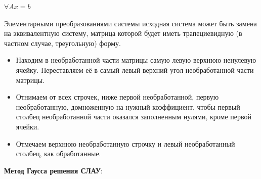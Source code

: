 \(\forall Ax = b\)

Элементарными преобразованиями системы исходная система может быть замена на эквивалентную систему, матрица которой будет иметь трапециевидную (в частном случае, треугольную) форму.

\prooff{}
\begin{itemize}
    \item Находим в необработанной части матрицы самую левую верхнюю ненулевую ячейку. Переставляем её в самый левый верхний угол необработанной части матрицы.

    \item Отнимаем от всех строчек, ниже первой необработанной, первую необработанную, домноженную на нужный коэффициент, чтобы первый столбец необработанной части оказался заполненным нулями, кроме первой ячейки.

    \item Отмечаем верхнюю необработанную строчку и левый необработанный столбец, как обработанные.
\end{itemize}

\textbf{Метод Гаусса решения СЛАУ}:

